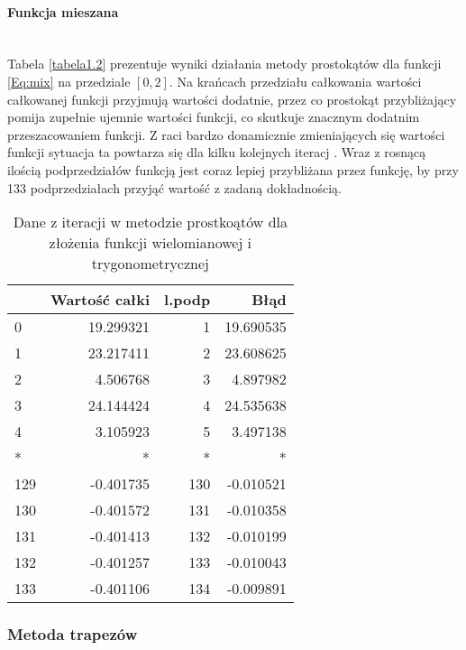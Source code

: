 \documentclass[12pt,twoside]{article}
\begin{document}
\paragraph{Funkcja mieszana}\mbox{} \\

Tabela \eqref{tabela1.2} prezentuje wyniki działania metody prostokątów dla funkcji \eqref{Eq:mix} na przedziale $[0,2]$.
Na krańcach przedziału całkowania wartości całkowanej funkcji przyjmują  wartości dodatnie, przez co prostokąt przybliżający pomija zupełnie ujemnie wartości funkcji, co skutkuje znacznym dodatnim przeszacowaniem funkcji. Z raci bardzo donamicznie zmieniających się wartości funkcji sytuacja ta powtarza się dla kilku kolejnych iteracj . Wraz z rosnącą ilością podprzedziałów funkcją jest coraz lepiej przybliżana przez funkcję, by przy 133 podprzedziałach przyjąć wartość z zadaną dokładnością.



\begin{table}[H]
\centering
\caption{Dane z iteracji w metodzie prostkoątów dla złożenia funkcji wielomianowej i trygonometrycznej}
\label{tabela1.3}
\begin{tabular}{lrrr}
\toprule
{} &  Wartość całki &  l.podp &       Błąd \\
\midrule
0   &      19.299321 &       1 &  19.690535 \\
1   &      23.217411 &       2 &  23.608625 \\
2   &       4.506768 &       3 &   4.897982 \\
3   &      24.144424 &       4 &  24.535638 \\
4   &       3.105923 &       5 &   3.497138 \\
*   &       * &       * &   * \\
129 &      -0.401735 &     130 &  -0.010521 \\
130 &      -0.401572 &     131 &  -0.010358 \\
131 &      -0.401413 &     132 &  -0.010199 \\
132 &      -0.401257 &     133 &  -0.010043 \\
133 &      -0.401106 &     134 &  -0.009891 \\
\bottomrule
\end{tabular}
\end{table}



\subsubsection{Metoda trapezów}
\end{document}
